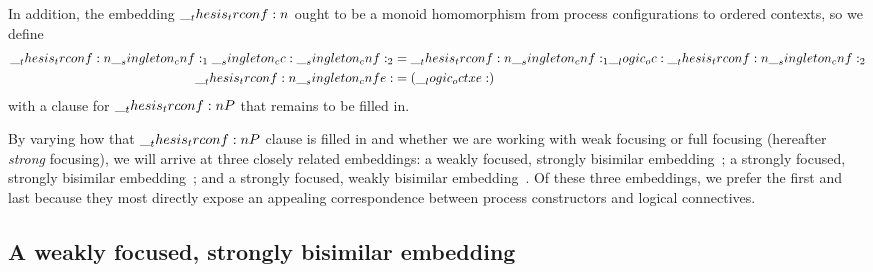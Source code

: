 In addition, the embedding $\__thesis_trconf:n {}$ ought to be a monoid homomorphism from process configurations to ordered contexts, so we define
\begin{equation*}
  \begin{aligned}
    \__thesis_trconf:n {\__singleton_cnf:_1 \__singleton_cc: \__singleton_cnf:_2} &= \__thesis_trconf:n {\__singleton_cnf:_1} \__logic_oc: \__thesis_trconf:n {\__singleton_cnf:_2} \\
    \__thesis_trconf:n {\__singleton_cnfe:} &= (\__logic_octxe:)
  \end{aligned}
\end{equation*}
with a clause for $\__thesis_trconf:n {P}$ that remains to be filled in.

By varying how that $\__thesis_trconf:n {P}$ clause is filled in and whether we are working with weak focusing or full focusing (hereafter \emph{strong} focusing), we will arrive at three closely related embeddings: a weakly focused, strongly bisimilar embedding~; a strongly focused, strongly bisimilar embedding~; and a strongly focused, weakly bisimilar embedding~.
Of these three embeddings, we prefer the first and last because they most directly expose an appealing correspondence between process constructors and logical connectives.


\subsection{A weakly focused, strongly bisimilar embedding}\label{sec:embed:weak-focused-strong-bisim}



